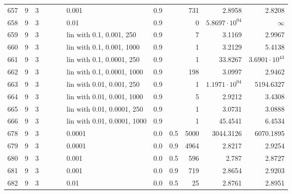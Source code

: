 \begin{longtable}{lrrrrrlrrrrr}
  657 &       9 & 3 &   &   &   &                       0.001 &      0.9 &        &     731 &                 2.8958 &                 2.8208 \\
  658 &       9 & 3 &   &   &   &                        0.01 &      0.9 &        &       0 &  $5.8697\cdot 10^{04}$ &               $\infty$ \\
  659 &       9 & 3 &   &   &   &    lin with 0.1, 0.001, 250 &      0.9 &        &       7 &                 3.1169 &                 2.9967 \\
  660 &       9 & 3 &   &   &   &   lin with 0.1, 0.001, 1000 &      0.9 &        &       1 &                 3.2129 &                 5.4138 \\
  661 &       9 & 3 &   &   &   &   lin with 0.1, 0.0001, 250 &      0.9 &        &       1 &                33.8267 &  $3.6901\cdot 10^{43}$ \\
  662 &       9 & 3 &   &   &   &  lin with 0.1, 0.0001, 1000 &      0.9 &        &     198 &                 3.0997 &                 2.9462 \\
  663 &       9 & 3 &   &   &   &   lin with 0.01, 0.001, 250 &      0.9 &        &       1 &  $1.1971\cdot 10^{04}$ &              5194.6327 \\
  664 &       9 & 3 &   &   &   &  lin with 0.01, 0.001, 1000 &      0.9 &        &       5 &                 2.9212 &                 3.4308 \\
  665 &       9 & 3 &   &   &   &  lin with 0.01, 0.0001, 250 &      0.9 &        &       1 &                 3.0731 &                 3.0888 \\
  666 &       9 & 3 &   &   &   & lin with 0.01, 0.0001, 1000 &      0.9 &        &       1 &                45.4541 &                 6.4534 \\
  678 &       9 & 3 &   &   &   &                      0.0001 &      0.0 &    0.5 &    5000 &              3044.3126 &              6070.1895 \\
  679 &       9 & 3 &   &   &   &                      0.0001 &      0.0 &    0.9 &    4964 &                 2.8217 &                 2.9254 \\
  680 &       9 & 3 &   &   &   &                       0.001 &      0.0 &    0.5 &     596 &                  2.787 &                 2.8727 \\
  681 &       9 & 3 &   &   &   &                       0.001 &      0.0 &    0.9 &     719 &                 2.8654 &                 2.9203 \\
  682 &       9 & 3 &   &   &   &                        0.01 &      0.0 &    0.5 &      25 &                 2.8761 &                 2.8951 \\

\end{longtable}

